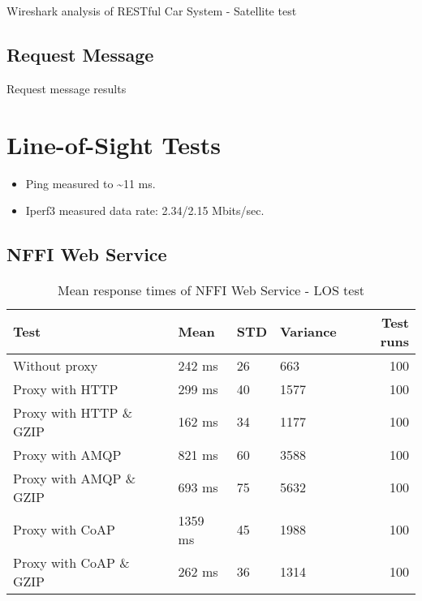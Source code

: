 \begin{appendices}
\begin{table}[H]

\caption{Wireshark analysis of RESTful Car System - Satellite test}
\end{table}

\subsection{Request Message}

\begin{table}[H]

\caption{Request message results}
\end{table}


\section{Line-of-Sight Tests}

\begin{itemize}
	\item Ping measured to \textasciitilde 11 ms.
	\item Iperf3 measured data rate: 2.34/2.15 Mbits/sec.
\end{itemize}

\subsection{NFFI Web Service}

\begin{table}[H]
\begin{tabular}{llllr}
\hline
 Test                   &   Mean &   STD &   Variance &   Test runs \\
\hline
  Without proxy & 242 ms & 26 & 663 & 100 \\
  Proxy with HTTP & 299 ms & 40 & 1577 & 100 \\
  Proxy with HTTP \& GZIP & 162 ms & 34 & 1177 & 100 \\
  Proxy with AMQP & 821 ms & 60 & 3588 & 100 \\
  Proxy with AMQP \& GZIP & 693 ms & 75 & 5632 & 100\\
  Proxy with CoAP & 1359 ms & 45 & 1988 & 100 \\
  Proxy with CoAP \& GZIP & 262 ms & 36 & 1314 & 100 \\
\end{tabular}
\caption{Mean response times of NFFI Web Service - LOS test}
\end{table}


\end{appendices}
